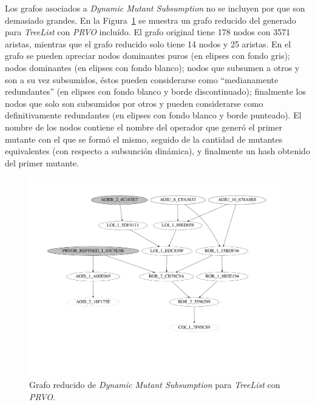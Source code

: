 Los grafos asociados a \emph{Dynamic Mutant Subsumption} no se incluyen por que son demasiado grandes. En la Figura~\ref{figures.examples.subsumption.reducedTreeListGraph} se muestra un grafo reducido del generado para \emph{TreeList} con \emph{PRVO} inclu\'ido. El grafo original tiene 178 nodos con 3571 aristas, mientras que el grafo reducido solo tiene 14 nodos y 25 aristas. En el grafo se pueden apreciar nodos dominantes puros (en elipses con fondo gris); nodos dominantes (en elipses con fondo blanco); nodos que subsumen a otros y son a su vez subsumidos, \'estos pueden considerarse como ``medianamente redundantes'' (en elipses con fondo blanco y borde discontinuado); finalmente los nodos que solo son subsumidos por otros y pueden considerarse como definitivamente redundantes (en elipses con fondo blanco y borde punteado). El nombre de los nodos contiene el nombre del operador que gener\'o el primer mutante con el que se form\'o el mismo, seguido de la cantidad de mutantes equivalentes (con respecto a subsunci\'on din\'amica), y finalmente un hash obtenido del primer mutante.

\begin{figure}
	\includegraphics[width=\linewidth]{figures/subsumption/dsg_apache_prvo_segment.pdf}
	\caption[Grafo de subsunci\'on para mutantes \emph{PRVO} de \emph{TreeList}]{Grafo reducido de \emph{Dynamic Mutant Subsumption} para \emph{TreeList} con \emph{PRVO}.}
	\label{figures.examples.subsumption.reducedTreeListGraph}
\end{figure}


